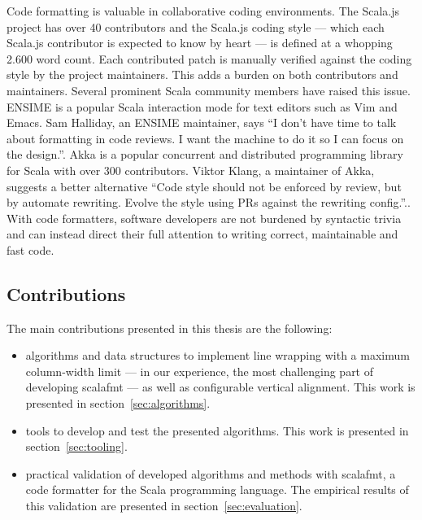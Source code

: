 Code formatting is valuable in collaborative coding environments.
The Scala.js project\autocite{_scala.js_????} has over 40 contributors and the Scala.js coding style\autocite{doeraene_scala.js_2015} --- which each Scala.js contributor is expected to know by heart --- is defined at a whopping 2.600 word count.
Each contributed patch is manually verified against the coding style by the project maintainers.
This adds a burden on both contributors and maintainers.
Several prominent Scala community members have raised this issue.
ENSIME\autocite{_ensime_????} is a popular Scala interaction mode for text editors such as Vim and Emacs.
Sam Halliday, an ENSIME maintainer, says ``I don't have time to talk about formatting in code reviews. I want the machine to do it so I can focus on the design.''\autocite{halliday_i_2016-1}.
Akka\autocite{_akka_????} is a popular concurrent and distributed programming library for Scala with over 300 contributors.
Viktor Klang, a maintainer of Akka, suggests a better alternative ``Code style should not be enforced by review, but by automate rewriting. Evolve the style using PRs against the rewriting config.''.\autocite{klang_code_2016}.
With code formatters, software developers are not burdened by syntactic trivia and can instead direct their full attention to writing correct, maintainable and fast code.

\subsection{Contributions}
The main contributions presented in this thesis are the following:
\begin{itemize}
  \item algorithms and data structures to implement line wrapping with a maximum column-width limit --- in our experience, the most challenging part of developing scalafmt --- as well as configurable vertical alignment.
    This work is presented in section~\ref{sec:algorithms}.
  \item tools to develop and test the presented algorithms.
    This work is presented in section~\ref{sec:tooling}.
  \item practical validation of developed algorithms and methods with scalafmt, a code formatter for the Scala programming language.
    The empirical results of this validation are presented in section~\ref{sec:evaluation}.
\end{itemize}
